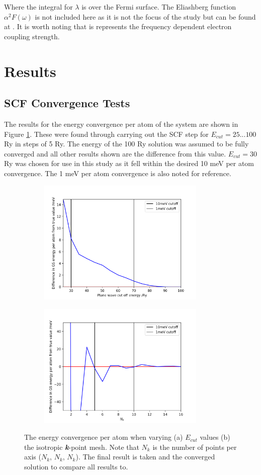 \documentclass[a4paper,12pt]{article}
\begin{document}
\noindent Where the integral for $\lambda$ is over the Fermi surface. The Eliashberg function $\alpha^2F(\omega)$ is not included here as it is not the focus of the study but can be found at \cite{estslides}. It is worth noting that is represents the frequency dependent electron coupling strength.

\section{Results}


\subsection{SCF Convergence Tests}
The results for the energy convergence per atom of the system are shown in Figure \ref{fig:E-conv}. These were found through carrying out the SCF step for $E_{cut} = 25 ... 100$ Ry in steps of 5 Ry. The energy of the 100 Ry solution was assumed to be fully converged and all other results shown are the difference from this value. $E_{cut} = 30$ Ry was chosen for use in this study as it fell within the desired 10 meV per atom convergence. The 1 meV per atom convergence is also noted for reference.

\begin{figure}[h!!!]
	\begin{subfigure}{0.5\textwidth}
	\centering
	\includegraphics[width=8cm]{E-conv.png}
	\subcaption{ }
	\label{fig:E-conv}
	\end{subfigure}%
	\begin{subfigure}{0.5\textwidth}
	\centering
	\includegraphics[width=8cm]{k-conv-zoom.png}
	\subcaption{ }
	\label{fig:k-conv}
\end{subfigure}%
\caption{The energy convergence per atom when varying (a) $E_{cut}$ values (b) the isotropic \textbf{\textit{k}}-point mesh. Note that $N_k$ is the number of points per axis ($N_k$, $N_k$, $N_k$). The final result is taken and the converged solution to compare all results to.}
\label{fig:scf}
\end{figure}
\end{document}
